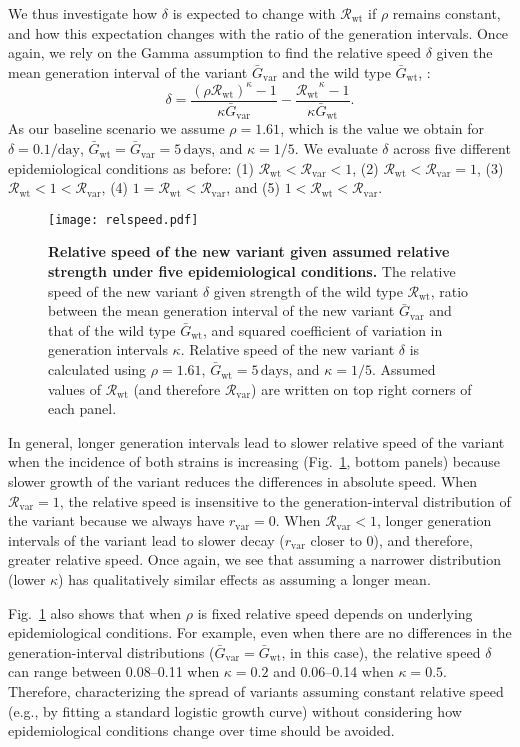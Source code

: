 \documentclass[12pt]{article}
\newcommand{\fref}[1]{Fig.~\ref{fig:#1}}
\newcommand{\vvvar}{\mathrm{var}}
\newcommand{\wwwt}{\mathrm{wt}}
\newcommand{\rx}[1]{\ensuremath{{r}_{#1}}\xspace}
\newcommand{\rv}{\rx{\vvvar}}
\newcommand{\Rx}[1]{\ensuremath{{\mathcal R}_{#1}}\xspace}
\newcommand{\Rw}{\Rx{\wwwt}}
\newcommand{\Rv}{\Rx{\vvvar}}
\newcommand{\days}{\ensuremath{\, \textrm{days}}}
\newcommand{\pday}{\ensuremath{/\textrm{day}}}
\newcommand{\Gx}[1]{\ensuremath{{\bar G}_{#1}}\xspace}
\newcommand{\Gw}{\Gx{\wwwt}}
\newcommand{\Gv}{\Gx{\vvvar}}
\begin{document}
We thus investigate how $\delta$ is expected to change with \Rw if $\rho$ remains constant, and how this expectation changes with the ratio of the generation intervals. 
Once again, we rely on the Gamma assumption to find the relative speed $\delta$ given the mean generation interval of the variant $\Gv$ and the wild type $\Gw$, :
\begin{equation}
\delta = \frac{(\rho \Rw)^{\kappa} - 1}{\kappa \Gv} - \frac{\Rw^{\kappa} - 1}{\kappa \Gw}.
\end{equation}
As our baseline scenario we assume $\rho = 1.61$, which is the value we obtain for $\delta=0.1\pday$, $\Gw = \Gv = 5\,\textrm{days}$, and $\kappa = 1/5$.
We evaluate $\delta$ across five different epidemiological conditions as before: (1) $\Rw < \Rv < 1$, (2) $\Rw < \Rv = 1$, (3) $\Rw < 1 < \Rv$, (4) $1 = \Rw < \Rv$, and (5) $1 < \Rw < \Rv$.

\begin{figure}[!th]
\texttt{[image: relspeed.pdf]}
\caption{
\textbf{Relative speed of the new variant given assumed relative strength under five epidemiological conditions.}
The relative speed of the new variant $\delta$ given strength of the wild type $\Rw$, ratio between the mean generation interval of the new variant $\Gv$ and that of the wild type $\Gw$, and squared coefficient of variation in generation intervals $\kappa$.
Relative speed of the new variant $\delta$ is calculated using $\rho=1.61$, $\Gw = 5\days$, and $\kappa = 1/5$.
Assumed values of $\Rw$ (and therefore $\Rv$) are written on top right corners of each panel.
}
\label{fig:relspeed}
\end{figure}

In general, longer generation intervals lead to slower relative speed of the variant when the incidence of both strains is increasing (\fref{relspeed}, bottom panels) because slower growth of the variant reduces the differences in absolute speed.
When $\Rv=1$, the relative speed is insensitive to the generation-interval distribution of the variant because we always have $\rv=0$.
When $\Rv<1$, longer generation intervals of the variant lead to slower decay ($\rv$ closer to 0), and therefore, greater relative speed.
Once again, we see that assuming a narrower distribution (lower $\kappa$) has qualitatively similar effects as assuming a longer mean.

\fref{relspeed} also shows that when $\rho$ is fixed relative speed depends on underlying epidemiological conditions. 
For example, even when there are no differences in the generation-interval distributions ($\Gv=\Gw$, in this case), the relative speed $\delta$ can range between 0.08--0.11 when $\kappa=0.2$ and 0.06--0.14 when $\kappa=0.5$.
Therefore, characterizing the spread of variants assuming constant relative speed (e.g., by fitting a standard logistic growth curve) without considering how epidemiological conditions change over time should be avoided.
\end{document}
